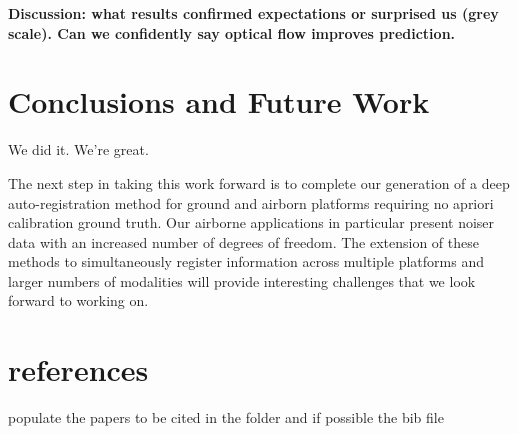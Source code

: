 \documentclass{article}
\begin{document}
 \textbf{Discussion: what results confirmed expectations or surprised us (grey scale). Can we confidently say optical flow improves prediction. }



\section{Conclusions and Future Work} %
\label{sec:conclusions_and_future_work}
We did it. We're great.

The next step in taking this work forward is to complete our generation of a deep auto-registration method for ground and airborn platforms requiring no apriori calibration ground truth.  Our airborne applications in particular present noiser data with an increased number of degrees of freedom. The extension of these methods to simultaneously register information across multiple platforms and larger numbers of modalities will provide interesting challenges that we look forward to working on. 



\section{references}
populate the papers to be cited in the folder and if possible the bib file




\end{document}
